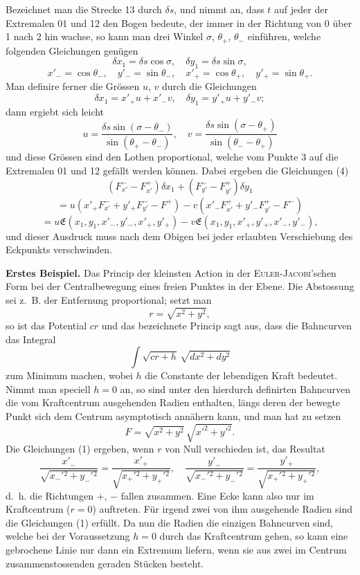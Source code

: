 \documentclass[11pt,a4paper,leqno]{article}
\begin{document}
Bezeichnet man die Strecke 13 durch $\delta s$, und nimmt an, dass $t$ auf jeder der Extremalen 01 und 12 den Bogen bedeute, der immer in der Richtung von 0 über 1 nach 2 hin wachse, so kann man drei Winkel $\sigma$, $\theta_+$, $\theta_-$ einführen, welche folgenden Gleichungen genügen
\[
\delta x_1=\delta s\cos\sigma,\quad \delta y_1=\delta s\sin\sigma,
\]
\[
x'_{-}=\cos\theta_{-},\quad y'_{-}=\sin\theta_{-},\quad
x'_{+}=\cos\theta_{+},\quad y'_{+}=\sin\theta_{+}.
\]
Man definire ferner die Grössen $u$, $v$ durch die Gleichungen
\begin{equation}\tag{4}
\delta x_1=x'_{+}u+x'_{-}v,
\quad \delta y_1=y'_{+}u+y'_{-}v;
\end{equation}
dann ergiebt sich leicht
\[
u=\frac{\delta s\sin(\sigma-\theta_{-})}{\sin(\theta_{+}-\theta_{-})},
\quad
v=\frac{\delta s\sin(\sigma-\theta_{+})}{\sin(\theta_{-}-\theta_{+})}
\]
und diese Grössen sind den Lothen proportional, welche vom Punkte 3 auf die Extremalen 01 und 12 gefällt werden können. Dabei ergeben die Gleichungen (4)
\[
(F_{x'}^- -F_{x'}^+)\delta x_1+(F_{y'}^- -F_{y'}^+)\delta y_1
\]
\[
=u(x'_{+}F_{x'}^-+y'_{+}F_{y'}^- -F^+)-v(x'_{-}F_{x'}^+ + y'_{-}F_{y'}^+ -F^-)
\]
\[
=u\mathfrak{E}(x_1,y_1,x'_{-},y'_{-},x'_{+},y'_{+})
-v\mathfrak{E}(x_1,y_1,x'_{+},y'_{+},x'_{-},y'_{-}),
\]
und dieser Ausdruck muss nach dem Obigen bei jeder erlaubten Verschiebung des Eckpunkts verschwinden.

\textbf{Erstes Beispiel.} Das Princip der kleinsten Action in der \textsc{Euler-Jacobi}'schen Form bei der Centralbewegung eines freien Punktes in der Ebene. Die Abstossung sei z.~B. der Entfernung proportional; setzt man
\[
r=\sqrt{x^2+y^2},
\]
so ist das Potential $cr$ und das bezeichnete Princip sagt aus, dass die Bahncurven das Integral
\[
\int \sqrt{cr+h}\,\sqrt{dx^2+dy^2}
\]
zum Minimum machen, wobei $h$ die Constante der lebendigen Kraft bedeutet. Nimmt man speciell $h=0$ an, so sind unter den hierdurch definirten Bahncurven die vom Kraftcentrum ausgehenden Radien enthalten, längs deren der bewegte Punkt sich dem Centrum asymptotisch annähern kann, und man hat zu setzen
\[
F=\sqrt{x^2+y^2}\,\sqrt{x'^2+y'^2}.
\]
Die Gleichungen (1) ergeben, wenn $r$ von Null verschieden ist, das Resultat
\[
\frac{x'_{-}}{\sqrt{x_{-}'{}^2+y_{-}'{}^2}}
=
\frac{x'_{+}}{\sqrt{x_{+}'{}^2+y_{+}'{}^2}},
\quad
\frac{y'_{-}}{\sqrt{x_{-}'{}^2+y_{-}'{}^2}}
=
\frac{y'_{+}}{\sqrt{x_{+}'{}^2+y_{+}'{}^2}},
\]
d.~h. die Richtungen $+$, $-$ fallen zusammen. Eine Ecke kann also nur im Kraftcentrum ($r=0$) auftreten. Für irgend zwei von ihm ausgehende Radien sind die Gleichungen (1) erfüllt. Da nun die Radien die einzigen Bahncurven sind, welche bei der Voraussetzung $h=0$ durch das Kraftcentrum gehen, so kann eine gebrochene Linie nur dann ein Extremum liefern, wenn sie aus zwei im Centrum zusammenstossenden geraden Stücken besteht.
\end{document}

